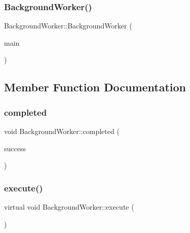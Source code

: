\subsubsection{\texorpdfstring{BackgroundWorker()}{BackgroundWorker()}}
{\footnotesize\ttfamily Background\+Worker\+::\+Background\+Worker (\begin{DoxyParamCaption}\item[{\mbox{\hyperlink{class_main_window}{Main\+Window}} $\ast$}]{main }\end{DoxyParamCaption})\hspace{0.3cm}{\ttfamily [explicit]}}



\subsection{Member Function Documentation}
\mbox{\label{class_background_worker_a6207f32592e55fb6cbe3f63ecb785b64}} 
\subsubsection{\texorpdfstring{completed}{completed}}
{\footnotesize\ttfamily void Background\+Worker\+::completed (\begin{DoxyParamCaption}\item[{bool}]{success }\end{DoxyParamCaption})\hspace{0.3cm}{\ttfamily [signal]}}

\mbox{\label{class_background_worker_ad9a721283a7c4aeb7c7a928ff677da00}} 
\subsubsection{\texorpdfstring{execute()}{execute()}}
{\footnotesize\ttfamily virtual void Background\+Worker\+::execute (\begin{DoxyParamCaption}{ }\end{DoxyParamCaption})\hspace{0.3cm}{\ttfamily [pure virtual]}}



